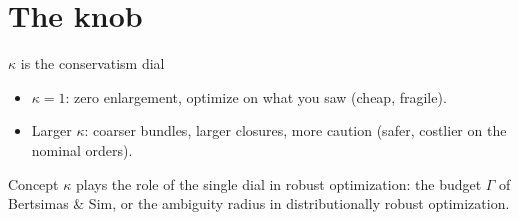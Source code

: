 \documentclass[11pt,aspectratio=169]{beamer}
\newcommand{\kk}{\kappa}
\begin{document}
\section{The knob}
\begin{frame}{$\kk$ is the conservatism dial}
  \begin{center}
  \end{center}
  \vspace{0.3em}
  \begin{itemize}
    \item $\kk=1$: zero enlargement, optimize on what you saw (cheap, fragile).
    \item Larger $\kk$: coarser bundles, larger closures, more caution
          (safer, costlier on the nominal orders).
  \end{itemize}
  \begin{alertblock}{Concept}
    $\kk$ plays the role of the single dial in robust
    optimization: the budget $\Gamma$ of Bertsimas \& Sim, or the ambiguity
    radius in distributionally robust optimization.
  \end{alertblock}
\end{frame}

\end{document}
